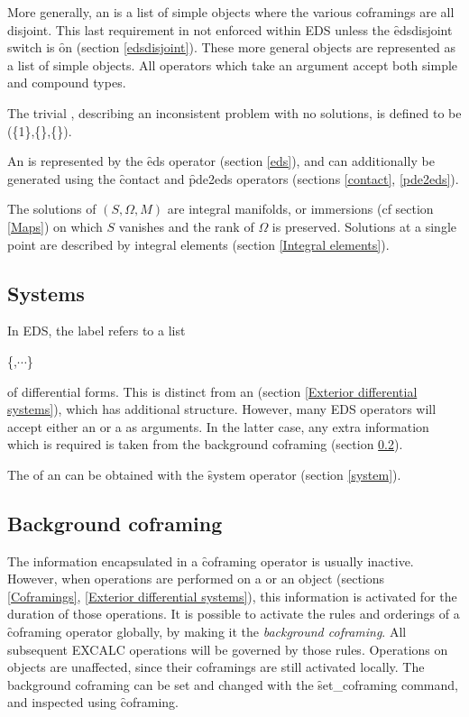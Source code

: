 More generally, an  is a list of simple  objects
where the various coframings are all disjoint. This last requirement in
not enforced within EDS unless the \f{edsdisjoint} switch is \f{on}
(section \ref{edsdisjoint}). These more general  objects are
represented as a list of simple  objects. All operators which
take an  argument accept both simple and compound types. 

The trivial , describing an inconsistent problem with no
solutions, is defined to be (\{1\},\{\},\{\}). 

An  is represented by the \f{eds} operator (section \ref{eds}),
and can additionally be generated using the \f{contact} and \f{pde2eds}
operators (sections \ref{contact}, \ref{pde2eds}).

The solutions of $(S,\Omega,M)$ are integral manifolds, or immersions (cf
section \ref{Maps}) on which $S$ vanishes and the rank of $\Omega$ is
preserved. Solutions at a single point are described by integral elements
(section \ref{Integral elements}).

\subsection{Systems}
\label{Systems}

In EDS, the label  refers to a list
\begin{syntax}
	\{,$\cdots$\}
\end{syntax}
of differential forms. This is distinct from an  (section
\ref{Exterior differential systems}), which has additional structure.
However, many EDS operators will accept either an  or a
 as arguments. In the latter case, any extra information
which is required is taken from the background coframing (section
\ref{Background coframing}). 

The  of an  can be obtained with the \f{system}
operator (section \ref{system}).

\subsection{Background coframing}
\label{Background coframing}

The information encapsulated in a \f{coframing} operator is usually
inactive. However, when operations are performed on a  or an
 object (sections \ref{Coframings}, \ref{Exterior differential
systems}), this information is activated for the duration of those
operations. It is possible to activate the rules and orderings of a
\f{coframing} operator globally, by making it the {\em background
coframing}. All subsequent EXCALC operations will be governed by those
rules. Operations on  objects are unaffected, since their
coframings are still activated locally. The background coframing can be set
and changed with the \f{set\_coframing} command, and inspected using
\f{coframing}.

